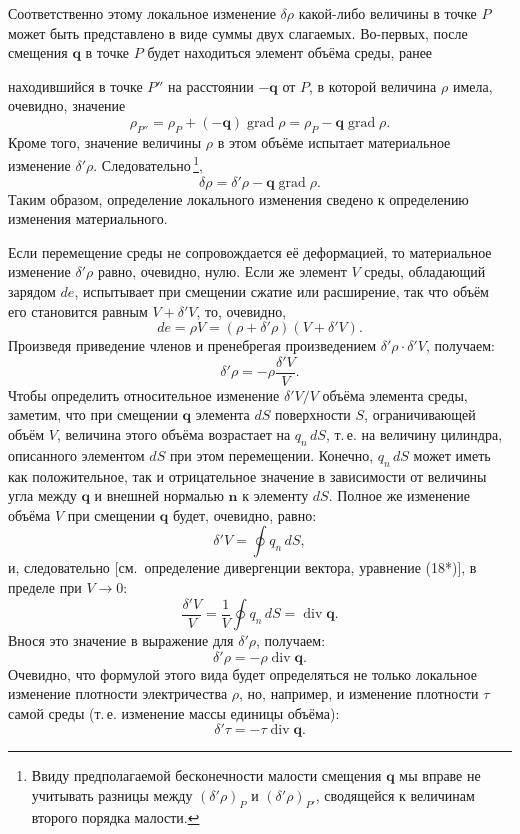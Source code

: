 \documentclass[a4paper,12pt]{article}
\begin{document}
Соответственно этому локальное изменение $\delta\rho$ какой-либо
величины в точке $P$ может быть представлено в виде суммы двух слагаемых.
Во-первых, после смещения $\mathbf{q}$ в точке $P$ будет находиться
элемент объёма среды, ранее


находившийся в точке $P''$ на расстоянии $-\mathbf{q}$ от $P$, в которой
величина $\rho$ имела, очевидно, значение
$$
    \rho_{P''} = \rho_P + (-\mathbf{q})\operatorname{grad}\rho
              = \rho_P - \mathbf{q}\operatorname{grad}\rho.
$$
Кроме того, значение величины $\rho$ в этом объёме испытает материальное
изменение $\delta'\rho$. Следовательно\,\footnote{Ввиду предполагаемой
бесконечности малости смещения $\mathbf{q}$ мы вправе не учитывать
разницы между $(\delta'\rho)_P$ и $(\delta'\rho)_{P'}$, сводящейся к
величинам второго порядка малости.},
\begin{equation}
    \delta\rho = \delta'\rho - \mathbf{q}\operatorname{grad}\rho.
    \tag{32.6}
\end{equation}
Таким образом, определение локального изменения сведено к определению
изменения материального.

Если перемещение среды не сопровождается её деформацией, то
материальное изменение $\delta'\rho$ равно, очевидно, нулю. Если же
элемент $V$ среды, обладающий зарядом $de$, испытывает при смещении
сжатие или расширение, так что объём его становится равным $V + \delta'V$,
то, очевидно,
$$
    de = \rho V = (\rho + \delta'\rho)(V + \delta'V).
$$
Произведя приведение членов и пренебрегая произведением
$\delta'\rho\cdot\delta'V$, получаем:
$$
    \delta'\rho = -\rho\frac{\delta'V}{V}.
$$
Чтобы определить относительное изменение $\delta'V/V$ объёма элемента
среды, заметим, что при смещении $\mathbf{q}$ элемента $dS$ поверхности
$S$, ограничивающей объём $V$, величина этого объёма возрастает на
$q_n\,dS$, т.\,е. на величину цилиндра, описанного элементом $dS$ при
этом перемещении. Конечно, $q_n\,dS$ может иметь как положительное, так
и отрицательное значение в зависимости от величины угла между
$\mathbf{q}$ и внешней нормалью $\mathbf{n}$ к элементу $dS$. Полное же
изменение объёма $V$ при смещении $\mathbf{q}$ будет, очевидно, равно:
$$
    \delta'V = \oint q_n\,dS,
$$
и, следовательно [см.\ определение дивергенции вектора, уравнение (18*)],
в пределе при $V \to 0$:
\begin{equation}
    \frac{\delta'V}{V} = \frac{1}{V}\oint q_n\,dS
                       = \operatorname{div}\mathbf{q}.
    \tag{32.7}
\end{equation}
Внося это значение в выражение для $\delta'\rho$, получаем:
\begin{equation}
    \delta'\rho = -\rho\operatorname{div}\mathbf{q}.
    \tag{32.8}
\end{equation}
Очевидно, что формулой этого вида будет определяться не только
локальное изменение плотности электричества $\rho$, но, например, и
изменение плотности $\tau$ самой среды (т.\,е. изменение массы единицы
объёма):
$$
    \delta'\tau = -\tau\operatorname{div}\mathbf{q}.
$$
\end{document}
